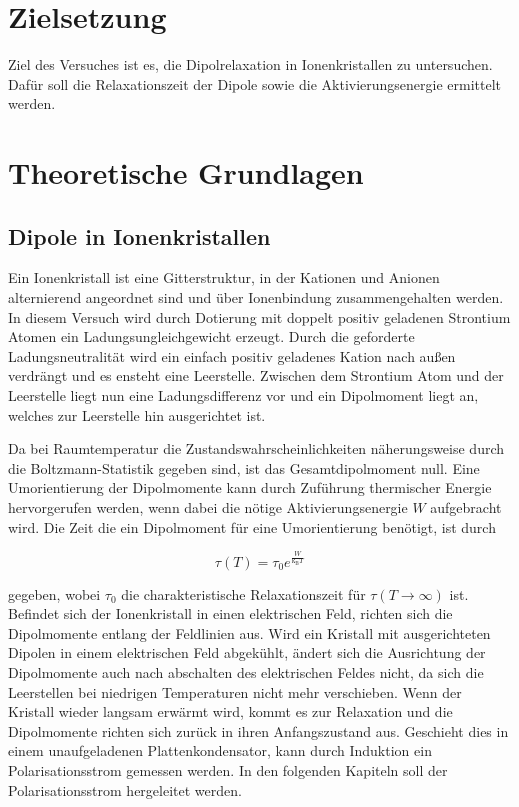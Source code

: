 \section{Zielsetzung}
Ziel des Versuches ist es, die Dipolrelaxation in Ionenkristallen zu untersuchen.
Dafür soll die Relaxationszeit der Dipole sowie die Aktivierungsenergie ermittelt werden.

\section{Theoretische Grundlagen}
\subsection{Dipole in Ionenkristallen}
Ein Ionenkristall ist eine Gitterstruktur, in der Kationen und Anionen alternierend angeordnet sind und über Ionenbindung zusammengehalten werden.
In diesem Versuch wird durch Dotierung mit doppelt positiv geladenen Strontium Atomen ein Ladungsungleichgewicht erzeugt.
Durch die geforderte Ladungsneutralität wird ein einfach positiv geladenes Kation nach außen verdrängt und es ensteht eine Leerstelle.
Zwischen dem Strontium Atom und der Leerstelle liegt nun eine Ladungsdifferenz vor und ein Dipolmoment liegt an, welches zur Leerstelle hin ausgerichtet ist.

\noindent
Da bei Raumtemperatur die Zustandswahrscheinlichkeiten näherungsweise durch die Boltzmann-Statistik gegeben sind, ist das Gesamtdipolmoment null.
Eine Umorientierung der Dipolmomente kann durch Zuführung thermischer Energie hervorgerufen werden, wenn dabei die nötige Aktivierungsenergie $W$ aufgebracht wird.
Die Zeit die ein Dipolmoment für eine Umorientierung benötigt, ist durch 

\begin{equation}
    \label{eqn:tau}
    \tau(T) = \tau_0 e^{\frac{W}{\text{k}_\text{B} T}}
\end{equation}

\noindent
gegeben, wobei $\tau_0$ die charakteristische Relaxationszeit für $\tau(T \to \infty)$ ist.
Befindet sich der Ionenkristall in einen elektrischen Feld, richten sich die Dipolmomente entlang der Feldlinien aus.
Wird ein Kristall mit ausgerichteten Dipolen in einem elektrischen Feld abgekühlt, ändert sich die Ausrichtung der Dipolmomente auch nach abschalten des elektrischen Feldes nicht, da sich die Leerstellen bei niedrigen Temperaturen nicht mehr verschieben.
Wenn der Kristall wieder langsam erwärmt wird, kommt es zur Relaxation und die Dipolmomente richten sich zurück in ihren Anfangszustand aus.
Geschieht dies in einem unaufgeladenen Plattenkondensator, kann durch Induktion ein Polarisationsstrom gemessen werden.
In den folgenden Kapiteln soll der Polarisationsstrom hergeleitet werden.

